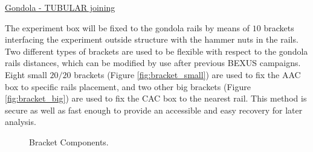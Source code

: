 \documentclass[a4paper,12pt,twoside]{article}
\begin{document}
\underline{Gondola - TUBULAR joining}

\smallskip
The experiment box will be fixed to the gondola rails by means of $10$ brackets interfacing the experiment outside structure with the hammer nuts in the rails. Two different types of brackets are used to be flexible with respect to the gondola rails distances, which can be modified by use after previous BEXUS campaigns. Eight small $20/20$ brackets (Figure \ref{fig:bracket_small}) are used to fix the AAC box to specific rails placement, and two other big brackets (Figure \ref{fig:bracket_big}) are used to fix the CAC box to the nearest rail. This method is secure as well as fast enough to provide an accessible and easy recovery for later analysis.

\begin{figure}[H]
    \noindent{}
    \caption{Bracket Components.}
    \label{fig:bracket}
\end{figure}
\end{document}
